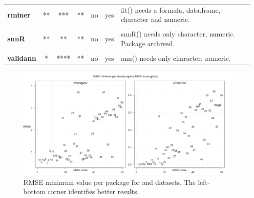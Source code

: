 \begin{Schunk}
\begin{table}
\begin{tabular}[t]{>{}lccccc>{\raggedright\arraybackslash}p{30em}}
\textbf{rminer} & ** & *** & ** & no & yes & fit() needs a formula, data.frame, character and numeric.\\
\cellcolor{gray!6}{\textbf{RSNNS}} & \cellcolor{gray!6}{**} & \cellcolor{gray!6}{***} & \cellcolor{gray!6}{**} & \cellcolor{gray!6}{no} & \cellcolor{gray!6}{yes} & \cellcolor{gray!6}{mlp() needs only character, numeric, boolean.}\\
\textbf{snnR} & ** & ** & ** & no & yes & snnR() needs only character, numeric. Package archived.\\
\cellcolor{gray!6}{\textbf{traineR}} & \cellcolor{gray!6}{*} & \cellcolor{gray!6}{**} & \cellcolor{gray!6}{**} & \cellcolor{gray!6}{yes} & \cellcolor{gray!6}{no} & \cellcolor{gray!6}{train.nnet() needs a formula, data.frame, numeric, boolean.}\\
\textbf{validann} & * & **** & ** & no & yes & ann() needs only character, numeric.\\
\bottomrule
\end{tabular}
\end{table}

\end{Schunk}

\begin{figure}
  \centering
  \includegraphics[width=\textwidth]{mIshigami-uDreyfus1-RMSEmin.png}
        \caption{RMSE minimum value per package for 
        and  datasets.
        The left-bottom corner identifies better results.}
        \label{fig:Allpkg:RMSEmin}
\end{figure}

